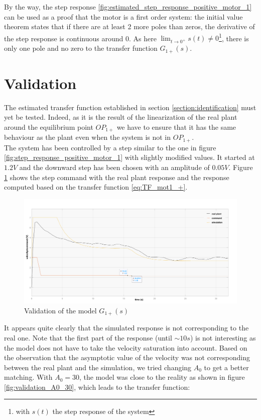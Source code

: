 By the way, the step response \ref{fig:estimated_step_response_positive_motor_1} can be used as a proof that the motor
is a first order system: the initial value theorem states that if there are at least 2 more poles than zeros, the 
derivative of the step response is continuous around 0. As here $\lim_{t \rightarrow 0^+} s(t) \neq 0$\footnote{with $s
(t)$ the step response of the system}, there is only one pole and no zero to the transfer function $G_{1+}(s)$.

\section{Validation}
\label{section_validation}

The estimated transfer function established in section \ref{section:identification} must yet be tested. Indeed, as it
is the result of the linearization of the real plant around the equilibrium point $OP_{1+}$ we have to ensure that it
has the same behaviour as the plant even when the system is not in $OP_{1+}$.\\

The system has been controlled by a step similar to the one in figure \ref{fig:step_response_positive_motor_1} with slightly
modified values. It started at $1.2 V$ and the downward step has been chosen with an amplitude of $0.05 V$. Figure 
\ref{fig:validation_A0_24} shows the step command with the real plant response and the response computed based on the
transfer function \ref{eq:TF_mot1_+}.

\begin{figure}[H]
    \centering
    \includegraphics[height=\textheight/3]{Pictures/validation_A0_24.png}
    \caption{Validation of the model $G_{1+} (s)$}
    \label{fig:validation_A0_24}
\end{figure}

It appears quite clearly that the simulated response is not corresponding to the real one. Note that the first part of
the response (until $\sim 10s$) is not interesting as the model does not have to take the velocity saturation into account.
Based on the observation that the asymptotic value of the velocity was not corresponding between the real plant and the
simulation, we tried changing $A_0$ to get a better matching. With $A_0 = 30$, the model was close to the reality as 
shown in figure \ref{fig:validation_A0_30}, which leads to the transfer function:

